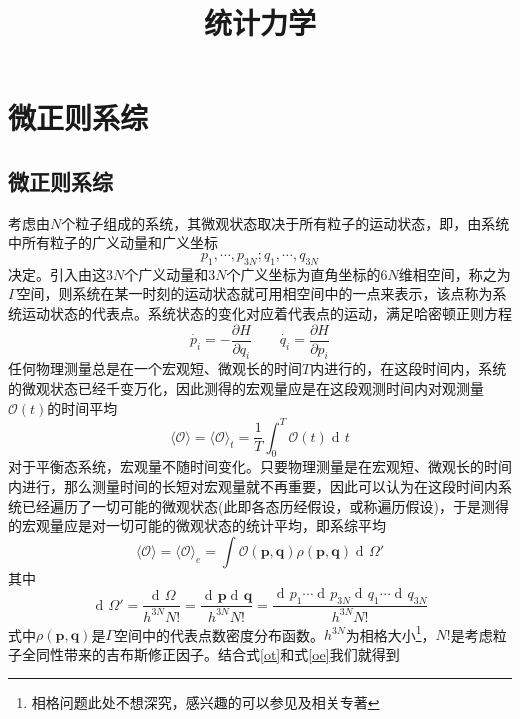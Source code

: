 \documentclass[UTF8,oneside,openany]{ctexbook}
\title{\heiti 统计力学}
\author{\empty}
\date{\empty}
\DeclareMathOperator\dif{d\!}
\newcommand\aver[1]{\langle#1\rangle}
\begin{document}
\maketitle
\hypersetup{linkcolor=black}
\tableofcontents
\thispagestyle{empty}
\newpage
\setcounter{page}{1}
\hypersetup{linkcolor=blue}

\chapter{微正则系综}
\section{微正则系综}
考虑由$N$个粒子组成的系统，其微观状态取决于所有粒子的运动状态，即，由系统中所有粒子的广义动量和广义坐标
\begin{equation}
p_1,\cdots,p_{3N};q_1,\cdots,q_{3N}
\end{equation}
决定。引入由这$3N$个广义动量和$3N$个广义坐标为直角坐标的$6N$维相空间，称之为$\Gamma$空间，则系统在某一时刻的运动状态就可用相空间中的一点来表示，该点称为系统运动状态的代表点。系统状态的变化对应着代表点的运动，满足哈密顿正则方程
\begin{equation}
\dot{p_i}=-\frac{\partial H}{\partial q_i}\qquad
\dot{q_i}=\frac{\partial H}{\partial p_i}
\end{equation}
任何物理测量总是在一个宏观短、微观长的时间$T$内进行的，在这段时间内，系统的微观状态已经千变万化，因此测得的宏观量应是在这段观测时间内对观测量$\mathcal{O}(t)$的时间平均
\begin{equation}\label{ot}
\aver{\mathcal{O}}=\aver{\mathcal{O}}_t=\frac1T\int_{0}^T\mathcal{O}(t)\dif t
\end{equation}
对于平衡态系统，宏观量不随时间变化。只要物理测量是在宏观短、微观长的时间内进行，那么测量时间的长短对宏观量就不再重要，因此可以认为在这段时间内系统已经遍历了一切可能的微观状态(此即各态历经假设，或称遍历假设)，于是测得的宏观量应是对一切可能的微观状态的统计平均，即系综平均
\begin{equation}\label{oe}
\aver{\mathcal{O}}=\aver{\mathcal{O}}_e=\int\mathcal{O}(\pmb{p},\pmb{q})\rho (\pmb{p},\pmb{q})\dif\Omega'
\end{equation}
其中
\begin{equation}
\dif\Omega'=\frac{\dif\Omega}{h^{3N}N!}=\frac{\dif\pmb{p}\dif\pmb{q}}{h^{3N}N!}=\frac{\dif p_1\cdots\dif p_{3N}\dif q_1\cdots\dif q_{3N}}{h^{3N}N!}
\end{equation}
式中$\rho(\pmb{p},\pmb{q})$是$\Gamma$空间中的代表点数密度分布函数。$h^{3N}$为相格大小\footnote{相格问题此处不想深究，感兴趣的可以参见\cite{h}及相关专著}，$N!$是考虑粒子全同性带来的吉布斯修正因子。结合式\ref{ot}和式\ref{oe}我们就得到
\end{document}
